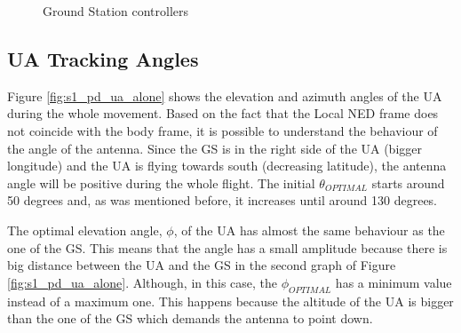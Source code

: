 \begin{figure}[H]
	\hfill
	\hfill
	\caption{Ground Station controllers}
	\label{fig:s1_gs}
\end{figure}

\subsection*{UA Tracking Angles}
Figure \ref{fig:s1_pd_ua_alone} shows the elevation and azimuth angles of the UA during the whole movement. Based on the fact that the Local NED frame does not coincide with the body frame, it is possible to understand the behaviour of the angle of the antenna. Since the GS is in the right side of the UA (bigger longitude) and the UA is flying towards south (decreasing latitude), the antenna angle will be positive during the whole flight.
The initial $\theta_{OPTIMAL}$ starts around 50 degrees and, as was mentioned before, it increases until around 130 degrees.

The optimal elevation angle, $\phi$, of the UA has almost the same behaviour as the one of the GS. This means that the angle has a small amplitude because there is big distance between the UA and the GS in the second graph of Figure \ref{fig:s1_pd_ua_alone}. Although, in this case, the $\phi_{OPTIMAL}$ has a minimum value instead of a maximum one. This happens because the altitude of the UA is bigger than the one of the GS which demands the antenna to point down.


